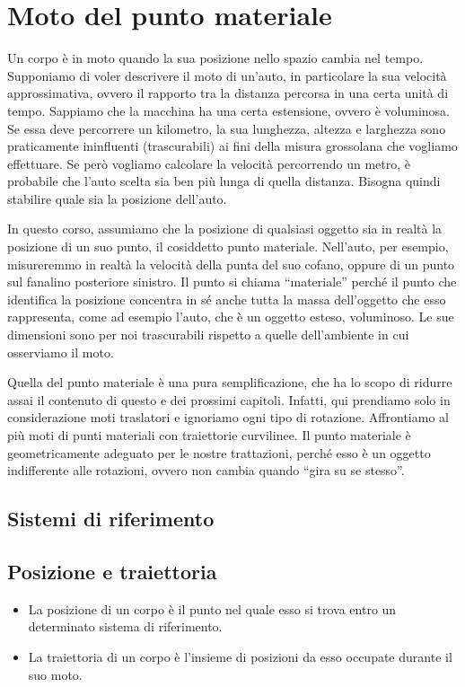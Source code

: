 \marginpar{\minitoc}

\section{Moto del punto materiale}
Un corpo è in moto quando la sua posizione nello spazio cambia nel tempo.
Supponiamo di voler descrivere il moto di un'auto, in particolare la sua
velocità approssimativa, ovvero il rapporto tra la distanza percorsa in
una certa unità di tempo.
Sappiamo che la macchina ha una certa estensione, ovvero è
voluminosa. Se essa deve percorrere un kilometro, la sua lunghezza,
altezza e larghezza sono praticamente ininfluenti (trascurabili) ai fini della misura
grossolana che vogliamo effettuare. Se però vogliamo calcolare la velocità
percorrendo un metro, è probabile che l'auto scelta sia ben più lunga
di quella distanza. Bisogna quindi stabilire quale sia la posizione
dell'auto.

In questo corso, assumiamo che la posizione di qualsiasi oggetto sia
in realtà la posizione di un suo punto, il cosiddetto punto materiale.
Nell'auto, per esempio, misureremmo in realtà la velocità della punta
del suo cofano, oppure di un punto sul fanalino posteriore sinistro.
Il punto si chiama ``materiale'' perché il punto che identifica la
posizione concentra in sé anche tutta la massa dell'oggetto che esso
rappresenta, come ad esempio l'auto, che è un oggetto esteso,
voluminoso. Le sue dimensioni sono per noi trascurabili rispetto
a quelle dell'ambiente in cui osserviamo il moto.

Quella del punto materiale è una pura semplificazione, che ha lo scopo
di ridurre assai il contenuto di questo e dei prossimi capitoli.
Infatti, qui prendiamo solo in considerazione moti traslatori e ignoriamo
ogni tipo di rotazione. Affrontiamo al più moti di punti materiali
con traiettorie curvilinee. Il punto materiale è geometricamente adeguato
per le nostre trattazioni, perché esso è un oggetto indifferente alle
rotazioni, ovvero non cambia quando ``gira su se stesso''.

\subsection{Sistemi di riferimento}

\subsection{Posizione e traiettoria}
\begin{tcolorbox}[colback = yellow!30, colframe = yellow!30!black, title = {Posizione e traiettoria}]
\begin{itemize}
    \item La posizione di un corpo è il punto nel quale esso si trova entro un
    determinato sistema di riferimento.

    \item La traiettoria di un corpo è l'insieme di posizioni da esso occupate
    durante il suo moto.
\end{itemize}
\end{tcolorbox}


